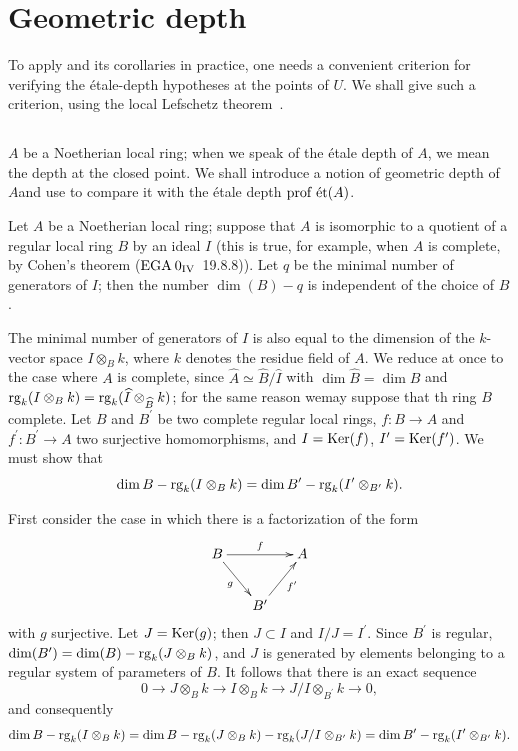 \section{Geometric depth} \label{XIV.5}

To apply  and its corollaries in practice, one needs a convenient criterion for verifying the étale-depth hypotheses at the points of $U$. We shall give such a criterion, using the local Lefschetz theorem~.

\subsection{} \label{XIV.5.1}  $A$ be a Noetherian local ring; when we speak of the étale depth of $A$, we mean the depth at the closed point. We shall introduce a notion of \og geometric depth of $A$\fg and use  to compare it with the étale depth $\operatorname{prof\;\acute{e}t}(A)$.

\begin{proposition} \label{XIV.5.2} Let $A$ be a Noetherian local ring; suppose that $A$ is isomorphic to a quotient of a regular local ring $B$ by an ideal $I$ (this is true, for example, when $A$ is complete, by Cohen's theorem (\textup{$\textup{EGA}\kern.2em 0_{\textup{IV}}$~19.8.8})). Let $q$ be the minimal number of generators of $I$; then the number $\dim(B)-q$ is independent of the choice of $B$.
\end{proposition}

The minimal number of generators of $I$ is also equal to the dimension of the $k$-vector space $I\otimes_{B}k$, where $k$ denotes the residue field of $A$. We reduce at once to the case where $A$ is complete, since $\widehat{A}\simeq\widehat{B}/\widehat{I}$ with $\dim \widehat{B}=\dim B$ and $\operatorname{rg}_{k}(I\otimes_{B}k)=\operatorname{rg}_{k}(\widehat{I}\otimes_{\widehat{B}}k)$; for the same reason we\pageoriginale may suppose that th ring $B$  complete\sisi{}{}. Let $B$ and $B^{\prime}$ be two complete regular local rings, $f\colon B\to A$ and $f^{\prime}\colon B^{\prime}\to A$ two surjective homomorphisms, and $I=\operatorname{Ker}(f)$, $I^{\prime}=\operatorname{Ker}(f^{\prime})$. We must show that
$$
\dim B-\operatorname{rg}_{k}(I\otimes_{B}k)=\dim B^{\prime}-\operatorname{rg}_{k}(I^{\prime}\otimes_{B^{\prime}}k).
$$

First consider the case in which there is a factorization
of the form
$$
\xymatrix@C=15pt{ B\ar[rr]^-{f}\ar[rd]_-{g} & & A\\
& B^{\prime}\ar[ru]_-{f^{\prime}} & }$$
with $g$ surjective. Let $J=\operatorname{Ker}(g)$; then $J\subset I$ and $I/J=I^{\prime}$. Since $B^{\prime}$ is regular, $\dim(B^{\prime})=\dim(B)-\operatorname{rg}_{k}(J\otimes_{B}k)$, and $J$ is generated by elements belonging to a regular system of parameters of $B$. It follows that there is an exact sequence
$$0\to J\otimes_{B}k\to I\otimes_{B}k\to J/I\otimes_{B^{\prime}}k\to 0,
$$
and consequently
$$
\dim B-\operatorname{rg}_{k}(I\otimes_{B}k)=\dim B-\operatorname{rg}_{k}(J\otimes_{B}k)-\operatorname{rg}_{k}(J/I\otimes_{B^{\prime}}k)=\dim B^{\prime}-\operatorname{rg}_{k}(I^{\prime}\otimes_{B^{\prime}}k).
$$

